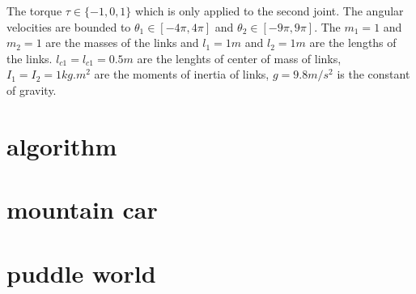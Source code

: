 \documentclass[preprint,12pt,authoryear]{elsarticle}
\begin{document}
The torque $\tau \in \{-1,0,1\}$ which is only applied to the second joint. The angular velocities are bounded to $\theta_1 \in [-4\pi,4\pi]$ and $\theta_2 \in [-9 \pi, 9\pi]$. The $m_1=1$ and $m_2=1$ are the masses of the links and $l_1 = 1 m$ and $l_2 = 1 m$ are the lengths of the links. $l_{c1}=l_{c1}=0.5 m$ are the lenghts of center of mass of links, $I_1 = I_2 = 1 kg.m^2$ are the moments of inertia of links, $g = 9.8 m/s^2$ is the constant of gravity.   






\section{algorithm}
\label{appen:algorithm}



\section{mountain car}
\label{appen:mountain-car}

\section{puddle world}
\label{appen:puddle-world}






\end{document}
